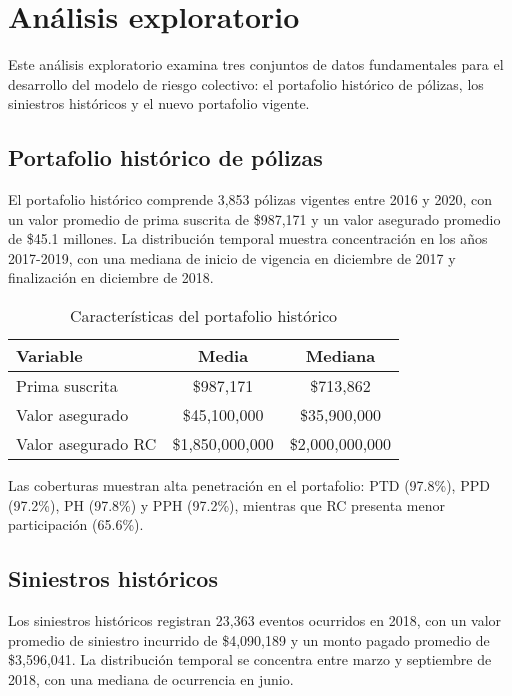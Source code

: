 \section{Análisis exploratorio}

Este análisis exploratorio examina tres conjuntos de datos fundamentales para el desarrollo del modelo de riesgo colectivo: el portafolio histórico de pólizas, los siniestros históricos y el nuevo portafolio vigente. 

\subsection{Portafolio histórico de pólizas}

El portafolio histórico comprende 3,853 pólizas vigentes entre 2016 y 2020, con un valor promedio de prima suscrita de \$987,171 y un valor asegurado promedio de \$45.1 millones. La distribución temporal muestra concentración en los años 2017-2019, con una mediana de inicio de vigencia en diciembre de 2017 y finalización en diciembre de 2018.

\begin{table}[H]
\centering
\caption{Características del portafolio histórico}
\begin{tabular}{lcc}
\hline
\textbf{Variable} & \textbf{Media} & \textbf{Mediana} \\
\hline
Prima suscrita & \$987,171 & \$713,862 \\
Valor asegurado & \$45,100,000 & \$35,900,000 \\
Valor asegurado RC & \$1,850,000,000 & \$2,000,000,000 \\
\hline
\end{tabular}
\end{table}

Las coberturas muestran alta penetración en el portafolio: PTD (97.8\%), PPD (97.2\%), PH (97.8\%) y PPH (97.2\%), mientras que RC presenta menor participación (65.6\%).

\subsection{Siniestros históricos}

Los siniestros históricos registran 23,363 eventos ocurridos en 2018, con un valor promedio de siniestro incurrido de \$4,090,189 y un monto pagado promedio de \$3,596,041. La distribución temporal se concentra entre marzo y septiembre de 2018, con una mediana de ocurrencia en junio.

